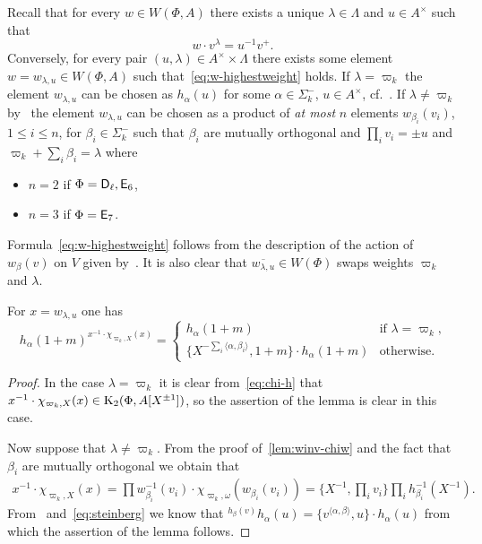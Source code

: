 Recall that for every $w \in W(\Phi, A)$ there exists a unique $\lambda \in \Lambda$ and $u \in A^\times $ such that
 \begin{equation}\label{eq:w-highestweight} w \cdot v^\lambda = u^{-1} v^+. \end{equation}
Conversely, for every pair $(u, \lambda) \in A^\times \times \Lambda$ there exists some element $w = w_{\lambda, u} \in W(\Phi, A)$ such that~\eqref{eq:w-highestweight} holds.
    If $\lambda = \varpi_k$ the element $w_{\lambda, u}$ can be chosen as $h_\alpha(u)$ for some $\alpha \in \Sigma_k^-$, $u \in A^\times$, cf.~\cite[Lemma~7]{V00}.
    If $\lambda \neq \varpi_k$ by~\cite[Lemma~6]{V00} the element $w_{\lambda, u}$ can be chosen as a product of \textit{at most} $n$ elements
     $w_{\beta_i}(v_i)$, $1 \leq i \leq n$, for $\beta_i\in\Sigma_k^-$ such that $\beta_i$ are mutually orthogonal and $\prod_i v_i = \pm u$ and $\varpi_k + \sum_i \beta_i = \lambda$ where
    \begin{itemize}
        \item $n=2$ if $\Phi = \mathsf{D}_\ell, \mathsf{E}_6$,
        \item $n=3$ if $\Phi = \mathsf{E}_7$.
    \end{itemize}
    Formula~\eqref{eq:w-highestweight} follows from the description of the action of $w_\beta(v)$ on $V$ given by~\cite[Lemma~6]{V00}.
    It is also clear that $\overline{w_{\lambda, u}} \in W(\Phi)$ swaps weights $\varpi_k$ and $\lambda$.


\begin{lemma} \label{h-computation} For $x = w_{\lambda, u}$ one has
 \begin{equation*}
      h_{\alpha}(1+m)^{x^{-1} \cdot \chi_{\varpi_k, X}(x)} =  \left\{
       \begin{array}{ll}
           h_{\alpha}(1+m) & \text{if $\lambda = \varpi_k$,}\\
           \{X^{-\sum_i\langle \alpha, \beta_i \rangle}, 1+m\} \cdot h_{\alpha}(1+m) & \text{otherwise.}\end{array}
      \right.
 \end{equation*}
\end{lemma}
\begin{proof}
In the case $\lambda = \varpi_k$ it is clear from~\eqref{eq:chi-h} that $x^{-1} \cdot \chi_{\varpi_k, X}(x) \in \operatorname{K}_2(\Phi, A[X^{\pm 1}])$,
 so the assertion of the lemma is clear in this case.

Now suppose that $\lambda \neq \varpi_k$.
From the proof of~\cref{lem:winv-chiw} and the fact that $\beta_i$ are mutually orthogonal we obtain that
\begin{multline*}
    x^{-1} \cdot \chi_{\varpi_k, X}(x) =
     \prod {w_{\beta_i}^{-1}(v_i) \cdot \chi_{\varpi_k, \omega}(w_{\beta_i}(v_i))} =
     \{ X^{-1}, \prod_i v_i \} \prod_i h_{\beta_i}^{-1}(X^{-1}).
\end{multline*}
    From~\cite[Lemme~5.2(e)]{Ma69} and~\eqref{eq:steinberg} we know that ${}^{h_\beta(v)}h_\alpha(u) = \{v^{\langle \alpha, \beta \rangle}, u\} \cdot h_\alpha(u)$
     from which the assertion of the lemma follows.
\end{proof}

